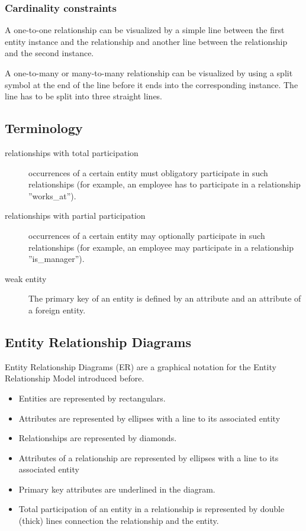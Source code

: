 \documentclass[a4paper,twocolumn]{article}
\begin{document}
\subsubsection{Cardinality constraints}

A one-to-one relationship can be visualized by a simple line between
the first entity instance and the relationship and another line between
the relationship and the second instance.

A one-to-many or many-to-many relationship can be visualized by using a
split symbol at the end of the line before it ends into the corresponding
instance. The line has to be split into three straight lines.

\subsection{Terminology}

\begin{description}
  \item[relationships with total participation]
        occurrences of a certain entity must obligatory participate
        in such relationships (for example, an employee has to
        participate in a relationship ''works\_at'').
  \item[relationships with partial participation]
        occurrences of a certain entity may optionally participate
        in such relationships (for example, an employee may
        participate in a relationship ''is\_manager'').
  \item[weak entity]
        The primary key of an entity is defined by an attribute
        and an attribute of a foreign entity.
\end{description}

\subsection{Entity Relationship Diagrams}

Entity Relationship Diagrams (ER) are a graphical notation for the
Entity Relationship Model introduced before.

\begin{itemize}
  \item Entities are represented by rectangulars.
  \item Attributes are represented by ellipses with a line to its
        associated entity
  \item Relationships are represented by diamonds.
  \item Attributes of a relationship are represented by ellipses with
        a line to its associated entity
  \item Primary key attributes are underlined in the diagram.
  \item Total participation of an entity in a relationship is
        represented by double (thick) lines connection
        the relationship and the entity.
\end{itemize}
\end{document}
